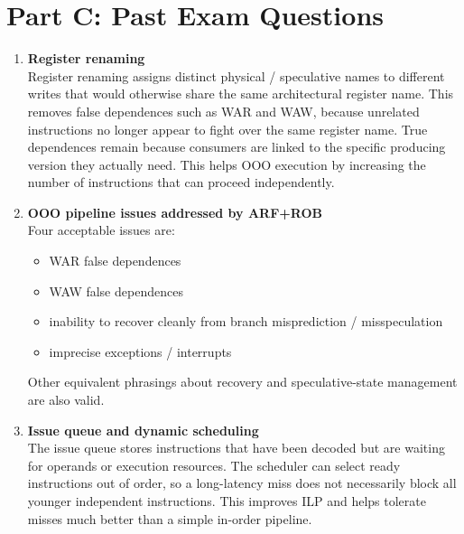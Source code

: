 \documentclass[11pt]{article}
\begin{document}
\section*{Part C: Past Exam Questions}
\begin{enumerate}[label=\textbf{C\arabic*.}]
  \item \textbf{Register renaming}
  \\[0.5ex]
  Register renaming assigns distinct physical / speculative names to different writes that would otherwise share the same architectural register name. This removes false dependences such as WAR and WAW, because unrelated instructions no longer appear to fight over the same register name. True dependences remain because consumers are linked to the specific producing version they actually need. This helps OOO execution by increasing the number of instructions that can proceed independently.

  \item \textbf{OOO pipeline issues addressed by ARF+ROB}
  \\[0.5ex]
  Four acceptable issues are:
  \begin{itemize}[leftmargin=1.5em]
    \item WAR false dependences
    \item WAW false dependences
    \item inability to recover cleanly from branch misprediction / misspeculation
    \item imprecise exceptions / interrupts
  \end{itemize}
  Other equivalent phrasings about recovery and speculative-state management are also valid.

  \item \textbf{Issue queue and dynamic scheduling}
  \\[0.5ex]
  The issue queue stores instructions that have been decoded but are waiting for operands or execution resources. The scheduler can select ready instructions out of order, so a long-latency miss does not necessarily block all younger independent instructions. This improves ILP and helps tolerate misses much better than a simple in-order pipeline.
\end{enumerate}
\end{document}
